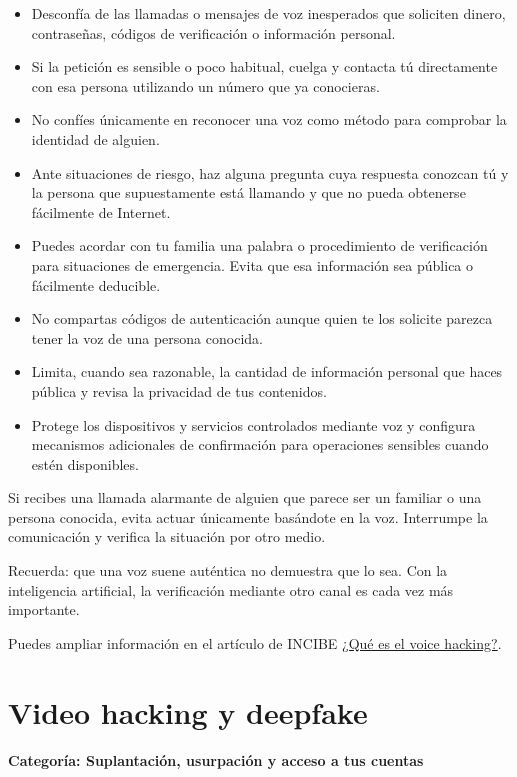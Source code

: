 \documentclass[
  spanish,
  a4paper,
  openany]{book}
\begin{document}
\begin{itemize}
\item
  Desconfía de las llamadas o mensajes de voz inesperados que soliciten dinero, contraseñas, códigos de verificación o información personal.
\item
  Si la petición es sensible o poco habitual, cuelga y contacta tú directamente con esa persona utilizando un número que ya conocieras.
\item
  No confíes únicamente en reconocer una voz como método para comprobar la identidad de alguien.
\item
  Ante situaciones de riesgo, haz alguna pregunta cuya respuesta conozcan tú y la persona que supuestamente está llamando y que no pueda obtenerse fácilmente de Internet.
\item
  Puedes acordar con tu familia una palabra o procedimiento de verificación para situaciones de emergencia. Evita que esa información sea pública o fácilmente deducible.
\item
  No compartas códigos de autenticación aunque quien te los solicite parezca tener la voz de una persona conocida.
\item
  Limita, cuando sea razonable, la cantidad de información personal que haces pública y revisa la privacidad de tus contenidos.
\item
  Protege los dispositivos y servicios controlados mediante voz y configura mecanismos adicionales de confirmación para operaciones sensibles cuando estén disponibles.
\end{itemize}

Si recibes una llamada alarmante de alguien que parece ser un familiar o una persona conocida, evita actuar únicamente basándote en la voz. Interrumpe la comunicación y verifica la situación por otro medio.

Recuerda: que una voz suene auténtica no demuestra que lo sea. Con la inteligencia artificial, la verificación mediante otro canal es cada vez más importante.

Puedes ampliar información en el artículo de INCIBE \href{https://www.incibe.es/ciudadania/blog/que-es-el-voice-hacking}{¿Qué es el voice hacking?}.

\section{Video hacking y deepfake}\label{video-hacking-y-deepfake}

\textbf{Categoría: Suplantación, usurpación y acceso a tus cuentas}
\end{document}
